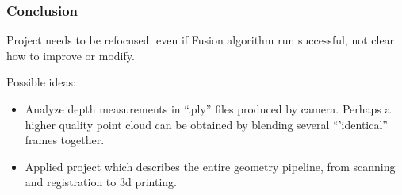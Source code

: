 \begin{frame}
\frametitle{Conclusion}
Project needs to be refocused: even if Fusion algorithm run successful,
not clear how to improve or modify.

Possible ideas:
\begin{itemize}
\item Analyze depth measurements in ``.ply'' files produced by camera. Perhaps
a higher quality point cloud can be obtained by blending several ``'identical''
frames together.
\item Applied project which describes the entire geometry pipeline, from
scanning and registration to 3d printing.
\end{itemize}

\end{frame}
